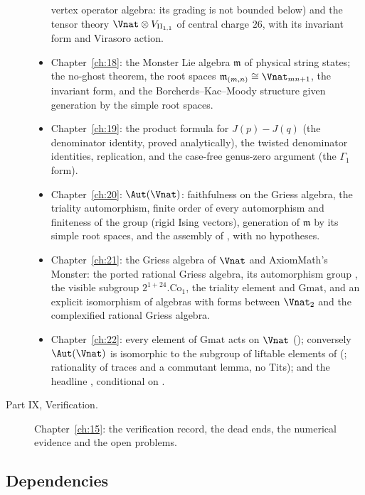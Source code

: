 \begin{description}
\begin{itemize}
    vertex operator algebra: its grading is not bounded below) and the tensor theory $\Vnat\otimes V_{\mathrm{II}_{1,1}}$
    of central charge $26$, with its invariant form and Virasoro action.
  \item Chapter~\ref{ch:18}: the Monster Lie algebra $\mathfrak m$ of physical string states; the no-ghost theorem,
    the root spaces $\mathfrak m_{(m,n)}\cong\Vnat_{mn+1}$, the invariant form, and the Borcherds--Kac--Moody structure
    given generation by the simple root spaces.
  \item Chapter~\ref{ch:19}: the product formula for $J(p)-J(q)$ (the denominator identity, proved analytically), the
    twisted denominator identities, replication, and the case-free genus-zero argument (the $\Gamma_1$ form).
  \item Chapter~\ref{ch:20}: $\Aut(\Vnat)$: faithfulness on the Griess algebra, the triality automorphism, finite order
    of every automorphism and finiteness of the group (rigid Ising vectors), generation of $\mathfrak m$ by its simple
    root spaces, and the assembly of , with no hypotheses.
  \item Chapter~\ref{ch:21}: the Griess algebra of $\Vnat$ and AxiomMath's Monster: the ported rational Griess
    algebra, its automorphism group , the visible subgroup $2^{1+24}.\mathrm{Co}_1$, the triality element and
    $\mathrm{Gmat}$, and an explicit isomorphism of algebras with forms between $\Vnat_2$ and the complexified rational
    Griess algebra.
  \item Chapter~\ref{ch:22}: every element of $\mathrm{Gmat}$ acts on $\Vnat$ (); conversely
    $\Aut(\Vnat)$ is isomorphic to the subgroup of liftable elements of 
    (; rationality of traces and a commutant lemma, no Tits); and the headline
    , conditional on .
  \end{itemize}
\item[Part IX, Verification.] Chapter~\ref{ch:15}: the verification record, the dead ends, the
  numerical evidence and the open problems.
\end{description}

\subsection{Dependencies}

